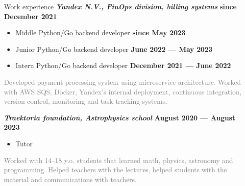 \documentclass{resume} %
\newcommand{\timestamp}[1]{\hfill {\small \textbf{#1}}}
\newcommand{\datedsubheader}[2]{\textbf{\textit{#1}} \timestamp{#2}}
\newcommand{\longversion}[1]{\ifdefined\LONG#1\fi}
\newcommand{\note}[1]{\textcolor{gray}{#1}}
\begin{document}
	\begin{rSection}{Work experience}
		\datedsubheader{Yandex N.V., FinOps division, billing systems}{since December 2021}
		\begin{itemize}
			\item Middle Python/Go backend developer \timestamp{since May 2023}
			\item Junior Python/Go backend developer \timestamp{June 2022 --- May 2023}
			\item Intern Python/Go backend developer \timestamp{December 2021 --- June 2022}
		\end{itemize}
		\longversion{
			\note{Developed payment processing system using microservice architecture.
			Worked with AWS SQS, Docker, Yandex's internal deployment, continuous integration, version control, monitoring and task tracking systems.}
		}

		\vspace{1em}

		\datedsubheader{Traektoria foundation, Astrophysics school}{August 2020 --- August 2023}
		\begin{itemize}
			\item Tutor
		\end{itemize}
		\longversion{
			\note{Worked with 14--18 y.o. students that learned math, physics, astronomy and programming.
			Helped teachers with the lectures, helped students with the material and communications with teachers.}
		}
    \end{rSection}
	
\end{document}
